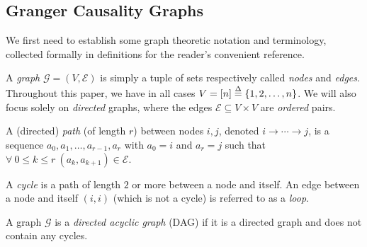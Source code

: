 \documentclass[12pt]{article}
\def\gc{\overset{\text{GC}}{\rightarrow}}  %
\def\te{\overset{\mathcal{T}}{\rightarrow}}  %
\def\gcg{\mathcal{G}}  %
\def\gcge{\mathcal{E}}  %
\newcommand{\gcgpath}[2]{#1 \rightarrow \cdots \rightarrow #2}  %
\begin{document}





\subsection{Granger Causality Graphs}
We first need to establish some graph theoretic notation and
terminology, collected formally in definitions for the reader's
convenient reference.

\begin{definition}
  A \textit{graph} $\gcg = (V, \gcge)$ is simply a
  tuple of sets respectively called \textit{nodes} and \textit{edges}.
  Throughout this paper, we have in all cases
  $V = [n] \overset{\Delta}{=} \{1, 2, \ldots, n\}$.  We will also focus solely on
  \textit{directed} graphs, where the edges
  $\gcge \subseteq V \times V$ are \textit{ordered} pairs.

  A (directed) \textit{path} (of length $r$) between nodes $i, j$,
  denoted $\gcgpath{i}{j}$, is a sequence
  $a_0, a_1, \ldots, a_{r - 1}, a_r$ with $a_0 = i$ and $a_r = j$ such
  that $\forall\ 0 \le k \le r\ (a_k, a_{k + 1}) \in \gcge$.

  A \textit{cycle} is a path of length $2$ or more between a node and
  itself.  An edge between a node and itself $(i, i)$ (which is not a
  cycle) is referred to as a \textit{loop}.

  A graph $\gcg$ is a \textit{directed acyclic graph} (DAG) if it is a
  directed graph and does not contain any cycles.
\end{definition}
\end{document}
